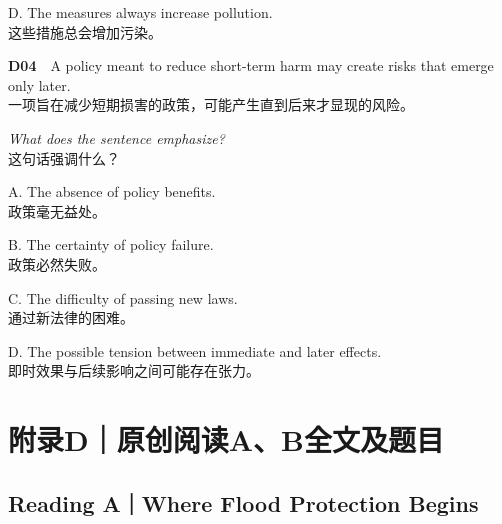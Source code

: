 \documentclass[a4paper,11pt,openany]{report}
\newcommand{\zhline}[1]{{\CJKsf\color{bodygrey}#1}}
\begin{document}
\begin{samepage}
D. The measures always increase pollution.\\
\zhline{这些措施总会增加污染。}
\par\end{samepage}

\begin{samepage}
\textbf{D04}　A policy meant to reduce short-term harm may create risks that emerge only later.\\
\zhline{一项旨在减少短期损害的政策，可能产生直到后来才显现的风险。}
\par\end{samepage}

\begin{samepage}
\emph{What does the sentence emphasize?}\\
\zhline{这句话强调什么？}
\par\end{samepage}

\begin{samepage}
A. The absence of policy benefits.\\
\zhline{政策毫无益处。}
\par\end{samepage}

\begin{samepage}
B. The certainty of policy failure.\\
\zhline{政策必然失败。}
\par\end{samepage}

\begin{samepage}
C. The difficulty of passing new laws.\\
\zhline{通过新法律的困难。}
\par\end{samepage}

\begin{samepage}
D. The possible tension between immediate and later effects.\\
\zhline{即时效果与后续影响之间可能存在张力。}
\par\end{samepage}

\section{附录D｜原创阅读A、B全文及题目}\label{ux9644ux5f55dux539fux521bux9605ux8bfbabux5168ux6587ux53caux9898ux76ee}

\subsection{Reading A｜Where Flood Protection Begins}\label{reading-awhere-flood-protection-begins-1}
\end{document}
